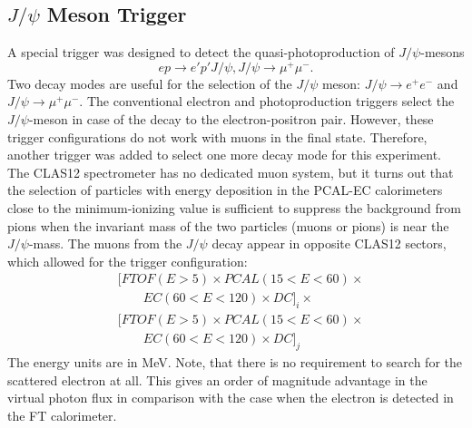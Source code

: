 \subsection{$J/\psi$ Meson Trigger}
\label{sec:meson_trigger}
A special trigger was designed to detect the quasi-photoproduction of $J/\psi$-mesons
$$
ep \to e' p' J/\psi, J/\psi \to \mu^+\mu^-.
$$
Two decay modes are useful for the selection of the $J/\psi$ meson: $J/\psi \to e^+e^-$ and $J/\psi \to \mu^+\mu^-$.
The conventional electron and photoproduction triggers  select the $J/\psi$-meson  in case of the decay to the electron-positron pair. However, these trigger configurations do not  work  with muons in the final state. Therefore, another trigger was added to select one more decay mode for this experiment. The CLAS12 spectrometer has no dedicated muon system, but it turns out that the selection of particles with energy deposition in the PCAL-EC calorimeters close to the minimum-ionizing  value is sufficient to suppress the background from pions when the invariant mass of the two particles (muons or pions) is near the $J/\psi$-mass. The muons from the $J/\psi$ decay appear in opposite CLAS12 sectors, which allowed for the trigger configuration:  
\begin{align*} 
 & [FTOF(E{{>}}5){\times}  PCAL(15{<}E{<}60){\times} \\
 & {\qquad} EC(60{<}E{<}120){\times}   DC]_i {\times} \\
 & [FTOF(E{{>}}5){\times}  PCAL(15{<}E{<}60){\times} \\
 & {\qquad} EC(60{<}E{<}120){\times}   DC]_j  
\end{align*}
\noindent
The energy units are in MeV. Note, that there is no requirement to search for the scattered electron at all. This gives an order of magnitude advantage in the  virtual photon flux in comparison with the case when the electron is detected in the FT calorimeter.
